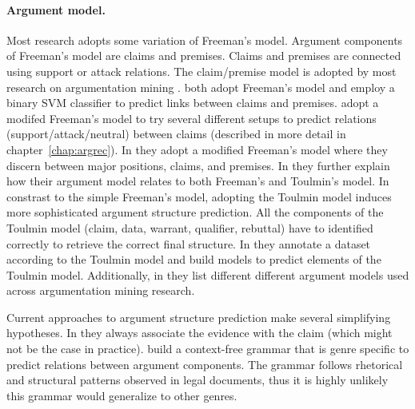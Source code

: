 \paragraph{Argument model. } Most research adopts some variation of
Freeman's model. Argument components of Freeman's model are claims and premises. 
Claims and premises are connected using support or attack relations. 
The claim/premise model is adopted by most research on argumentation mining
\citep{palau2009argumentation, peldszus2013argument, stab2014identifying, 
eckle2015role}. 
\citep{stab2014identifying, biran2011identifying} both adopt Freeman's model
and employ a binary SVM classifier to predict links between claims and
premises.
\citet{boltuzic2014back} adopt a modifed Freeman's model 
to try several different setups to predict relations (support/attack/neutral)
between claims (described in more detail in chapter~\ref{chap:argrec}).
In \citep{stab2014annotating, liebeck2016airport} they adopt a modified
Freeman's model
where they discern between major positions, claims, and premises. 
In \citep{liebeck2016airport} they further explain how their argument model
relates to both Freeman's and Toulmin's model. 
In constrast to the simple Freeman's model, adopting the Toulmin model induces
more sophisticated argument structure prediction.  All the components of the
Toulmin model (claim, data, warrant, qualifier, rebuttal) have to identified
correctly to retrieve the correct final structure.
In \citep{habernal2014argumentation} they annotate a dataset according to the
Toulmin model and build models to predict elements of the Toulmin model. 
Additionally, in \citep{habernal2014argumentation} they list different 
different argument models used across argumentation mining  
research.


Current approaches to argument structure prediction make several 
simplifying hypotheses. In \citep{aharoni2014benchmark} they always associate
the evidence with the claim (which might not be the case in practice).
\citet{palau2009argumentation} build a context-free grammar that is 
genre specific to predict relations between argument components. The grammar
follows rhetorical and structural patterns observed in legal documents, thus it is
highly unlikely this grammar would generalize to other genres. 

